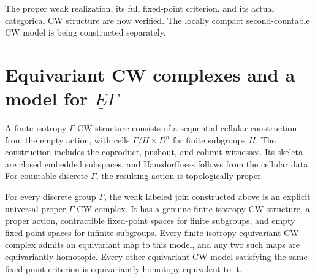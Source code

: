 The proper weak realization, its full fixed-point criterion, and its actual
categorical CW structure are now verified. The locally compact
second-countable CW model is being constructed separately.

\section{Equivariant CW complexes and a model for $\underline E\Gamma$}

\begin{definition}\label{def:equivariant-cw-complex}
\leanok
A finite-isotropy $\Gamma$-CW structure consists of a sequential cellular
construction from the empty action, with cells $\Gamma/H\times D^n$ for
finite subgroups $H$. The construction includes the coproduct, pushout,
and colimit witnesses. Its skeleta are closed embedded subspaces, and
Hausdorffness follows from the cellular data. For countable discrete
$\Gamma$, the resulting action is topologically proper.
\end{definition}

\begin{definition}\label{def:universal-proper-space}
\leanok
For every discrete group $\Gamma$, the weak labeled join constructed above
is an explicit universal proper $\Gamma$-CW complex. It has a genuine
finite-isotropy CW structure, a proper action, contractible fixed-point
spaces for finite subgroups, and empty fixed-point spaces for infinite
subgroups. Every finite-isotropy equivariant CW complex admits an equivariant
map to this model, and any two such maps are equivariantly homotopic.
Every other equivariant CW model satisfying the same fixed-point criterion
is equivariantly homotopy equivalent to it.
\end{definition}

